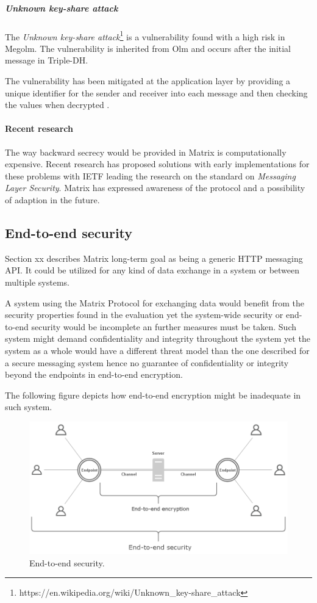 \subparagraph{Unknown key-share attack}

The \emph{Unknown key-share attack}\footnote{https://en.wikipedia.org/wiki/Unknown\_key-share\_attack} is a vulnerability found with a high risk in Megolm. The vulnerability is inherited from Olm and occurs after the initial message in Triple-DH. 

The vulnerability has been mitigated at the application layer by providing a unique identifier for the sender and receiver into each message and then checking the values when decrypted \cite{ncc}.

\paragraph{Recent research}
The way backward secrecy would be provided in Matrix is computationally expensive. Recent research has proposed solutions with early implementations for these problems with IETF leading the research on the standard on \emph{Messaging Layer Security}. Matrix has expressed awareness of the protocol and a possibility of adaption in the future.

\subsection{End-to-end security} \label{endtoend}

Section xx describes Matrix long-term goal as being a generic HTTP messaging API. It could be utilized for any kind of data exchange in a system or between multiple systems.

A system using the Matrix Protocol for exchanging data would benefit from the security properties found in the evaluation yet the system-wide security or end-to-end security would be incomplete an further measures must be taken. Such system might demand confidentiality and integrity throughout the system yet the system as a whole would have a different threat model than the one described for a secure messaging system hence no guarantee of confidentiality or integrity beyond the endpoints in end-to-end encryption. 

The following figure depicts how end-to-end encryption might be inadequate in such system. 

\begin{figure}[H]
	\centering
	\includegraphics[width=12cm]{figures/e2esecurity.png}
	\caption{End-to-end security.}
	\label{fig:e2esecurity}
\end{figure}

